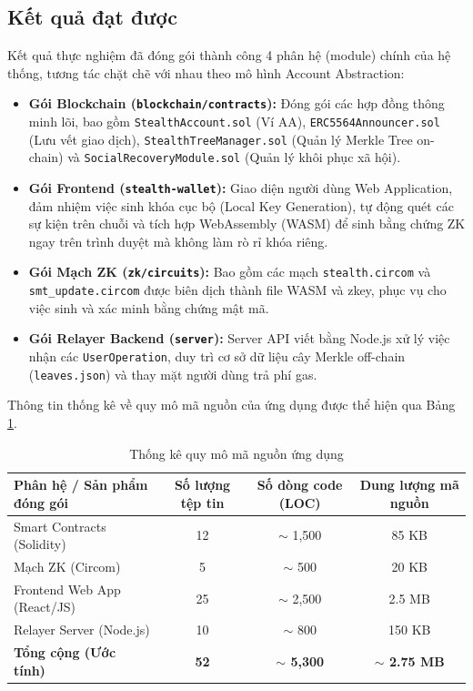 \documentclass[../DoAn.tex]{subfiles}
\begin{document}
\subsection{Kết quả đạt được}
Kết quả thực nghiệm đã đóng gói thành công 4 phân hệ (module) chính của hệ thống, tương tác chặt chẽ với nhau theo mô hình Account Abstraction:
\begin{itemize}
    \item \textbf{Gói Blockchain (\texttt{blockchain/contracts}):} Đóng gói các hợp đồng thông minh lõi, bao gồm \texttt{StealthAccount.sol} (Ví AA), \texttt{ERC5564Announcer.sol} (Lưu vết giao dịch), \texttt{StealthTreeManager.sol} (Quản lý Merkle Tree on-chain) và \texttt{SocialRecoveryModule.sol} (Quản lý khôi phục xã hội).
    \item \textbf{Gói Frontend (\texttt{stealth-wallet}):} Giao diện người dùng Web Application, đảm nhiệm việc sinh khóa cục bộ (Local Key Generation), tự động quét các sự kiện trên chuỗi và tích hợp WebAssembly (WASM) để sinh bằng chứng ZK ngay trên trình duyệt mà không làm rò rỉ khóa riêng.
    \item \textbf{Gói Mạch ZK (\texttt{zk/circuits}):} Bao gồm các mạch \texttt{stealth.circom} và \texttt{smt\_update.circom} được biên dịch thành file WASM và zkey, phục vụ cho việc sinh và xác minh bằng chứng mật mã.
    \item \textbf{Gói Relayer Backend (\texttt{server}):} Server API viết bằng Node.js xử lý việc nhận các \texttt{UserOperation}, duy trì cơ sở dữ liệu cây Merkle off-chain (\texttt{leaves.json}) và thay mặt người dùng trả phí gas.
\end{itemize}

Thông tin thống kê về quy mô mã nguồn của ứng dụng được thể hiện qua Bảng \ref{table:stats}.

\begin{table}[H]
\centering{}
    \begin{tabular}{|l|c|c|c|}
        \hline
        \textbf{Phân hệ / Sản phẩm đóng gói} & \textbf{Số lượng tệp tin} & \textbf{Số dòng code (LOC)} & \textbf{Dung lượng mã nguồn} \\ \hline
        Smart Contracts (Solidity) & 12 & $\sim$ 1,500 & 85 KB \\ \hline
        Mạch ZK (Circom) & 5 & $\sim$ 500 & 20 KB \\ \hline
        Frontend Web App (React/JS) & 25 & $\sim$ 2,500 & 2.5 MB \\ \hline
        Relayer Server (Node.js) & 10 & $\sim$ 800 & 150 KB \\ \hline
        \textbf{Tổng cộng (Ước tính)} & \textbf{52} & \textbf{$\sim$ 5,300} & \textbf{$\sim$ 2.75 MB} \\ \hline
    \end{tabular}
    \caption{Thống kê quy mô mã nguồn ứng dụng}
    \label{table:stats}
\end{table}
\end{document}
